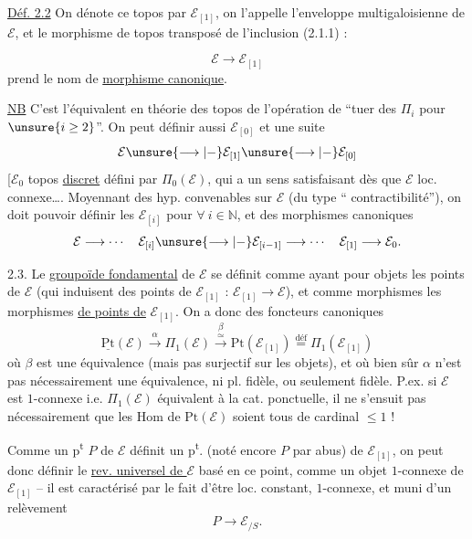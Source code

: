 \uline{Déf. 2.2} On dénote ce topos par $\mathcal E_{[1]}$, on l'appelle l'enveloppe multigaloisienne de $\mathcal E$, et le morphisme de topos transposé de l'inclusion (2.1.1) :


\[
\mathcal E\longrightarrow\mathcal E_{[1]}
\]
prend le nom de \uline{morphisme canonique}.

\uline{NB} C'est l'équivalent en théorie des topos de l'opération de ``tuer des $\Pi_i$ pour $\unsure{i\geq 2}$''. On peut définir aussi   $\mathcal E_{[0]}$ et une suite
\[
\mathcal E\unsure{\longrightarrow|-}\mathcal E_{[1]}\unsure{\longrightarrow|-}\mathcal E_{[0]}
\]
[$\mathcal E_0$  topos \uline{discret} défini par $\Pi_0(\mathcal E)$, qui a un sens satisfaisant dès que $\mathcal E$ loc. connexe\dots\unsure{]|!}. Moyennant des hyp. convenables sur $\mathcal E$ (du type `` contractibilité''), on doit pouvoir définir les $\mathcal E_{[i]}$ pour $\forall\ i\in\mathbb N$, et des morphismes canoniques
\[
\mathcal E\longrightarrow\cdots\quad
\mathcal E_{[i]}\unsure{\longrightarrow|-}\mathcal E_{[i-1]}\longrightarrow\cdots\quad
\mathcal E_{[1]}\longrightarrow\mathcal E_0.
\]


2.3. Le \uline{groupoïde fondamental} de $\mathcal E$ se définit comme ayant pour objets les points de $\mathcal E$ (qui induisent des points de $\mathcal E_{[1]}$  : $\mathcal E_{[1]}\longrightarrow\mathcal E$), et comme morphismes les  morphismes \uline{de points de} $\mathcal E_{[1]}$. On a donc des foncteurs canoniques
\[
\underline{\mathrm{Pt}}(\mathcal E)
\xrightarrow{\alpha}\Pi_1(\mathcal E)
\overset{\beta}{\overset{\simeq}{\longrightarrow}}
\mathrm{Pt}(\mathcal E_{[1]})
\overset{\text{déf}}{=}\Pi_1(\mathcal E_{[1]})
\]
où $\beta$ est une équivalence (mais pas surjectif sur les objets), et où bien sûr $\alpha$ n'est pas nécessairement une équivalence, ni  pl. fidèle, ou seulement fidèle. P.ex. si $\mathcal E$ est $1$-connexe i.e. $\Pi_1(\mathcal E)$ équivalent à la cat. ponctuelle, il ne s'ensuit pas nécessairement que les Hom de $\mathrm{Pt}(\mathcal E)$ soient tous de cardinal $\leq 1$ !


Comme un p\textsuperscript{t} $P$ de $\mathcal E$ définit un p\textsuperscript{t}. (noté encore $P$ par abus) de $\mathcal E_{[1]}$, on peut donc définir le \uline{rev. universel de $\mathcal E$} basé en ce point, comme un objet  $1$-connexe de $\mathcal E_{[1]}$ -- il est caractérisé  par le fait d'être loc. constant, $1$-connexe, et muni d'un relèvement
\[
P\longrightarrow\mathcal E_{/S}.
\]

